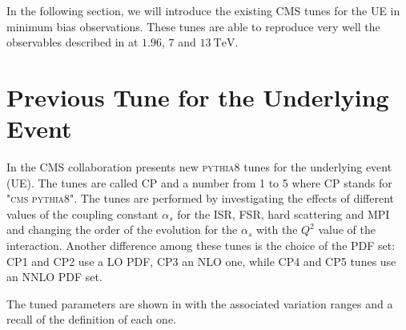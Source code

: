 In the following section, we will introduce the existing CMS tunes for the  UE in minimum bias observations. These tunes are able to reproduce very well the observables described in  at $1.96$, $7$ and $13\ \mathrm{TeV}$. 


\section{Previous Tune for the Underlying Event}

In \cite{CPtunes} the CMS collaboration presents new \textsc{pythia8} tunes for the underlying event (UE). The tunes are called CP and a number from 1 to 5 where CP stands for \textsc{"cms pythia8"}. The tunes are performed by investigating the effects of different values of the coupling constant $\alpha_s$ for the ISR, FSR, hard scattering and MPI and changing the order of the evolution for the $\alpha_s$ with the $Q^2$ value of the interaction. Another difference among these tunes is the choice of the PDF set: CP1 and CP2 use a LO PDF, CP3 an NLO one, while CP4 and CP5 tunes use an NNLO PDF set. 

The tuned parameters are shown in  with the associated variation ranges and a recall of the definition of each one. 
\begin{table}[H]
	\centering
	\caption{This table reports the five parameters tuned for the UE  in CP* tunes, the variation ranges used for the sampling are shown in the last column. Table from \cite{CPtunes}}
	\label{table:CP5variations}
\end{table}

